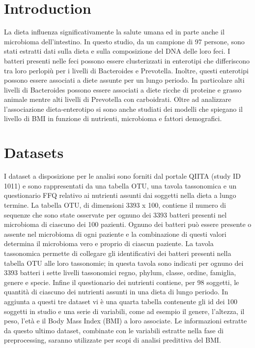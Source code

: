 \section{Introduction}
La dieta influenza significativamente la salute umana ed in parte anche il microbioma dell’intestino. In questo studio, da un campione di 97 persone, sono stati estratti dati sulla dieta e sulla composizione del DNA delle loro feci. I batteri presenti nelle feci possono essere clusterizzati in enterotipi che differiscono tra loro perlopiù per i livelli di Bacteroides e Prevotella. Inoltre, questi enterotipi possono essere associati a diete assunte per un lungo periodo. In particolare alti livelli di Bacteroides possono essere associati a diete ricche di proteine e grasso animale mentre alti livelli di Prevotella con carboidrati. 
Oltre ad analizzare l’associazione dieta-enterotipo si sono anche studiati dei modelli che spiegano il livello di BMI in funzione di nutrienti, microbioma e fattori demografici.

\section{Datasets}
I dataset a disposizione per le analisi sono forniti dal portale QIITA (study ID 1011) e sono rappresentati da una tabella OTU, una tavola tassonomica e un questionario FFQ relativo ai nutrienti assunti dai soggetti nella dieta a lungo termine. La tabella OTU, di dimensioni 3393 x 100, contiene il numero di sequenze che sono state osservate per ognuno dei 3393 batteri presenti nel microbioma di ciascuno dei 100 pazienti. Ognuno dei batteri può essere presente o assente nel microbioma di ogni paziente e la combinazione di questi valori determina il microbioma vero e proprio di ciascun paziente. La tavola tassonomica permette di collegare gli identificativi dei batteri presenti nella tabella OTU alle loro tassonomie; in questa tavola sono indicati per ognuno dei 3393 batteri i sette livelli tassonomici regno, phylum, classe, ordine, famiglia, genere e specie. Infine il questionario dei nutrienti contiene, per 98 soggetti, le quantità di ciascuno dei nutrienti assunti in una dieta di lungo periodo. In aggiunta a questi tre dataset vi è una quarta tabella contenente gli id dei 100 soggetti in studio e una serie di variabili, come ad esempio il genere, l’altezza, il peso, l’età e il Body Mass Index (BMI) a loro associate. Le informazioni estratte da questo ultimo dataset, combinate con le variabili estratte nella fase di preprocessing, saranno utilizzate per scopi di analisi predittiva del BMI.

